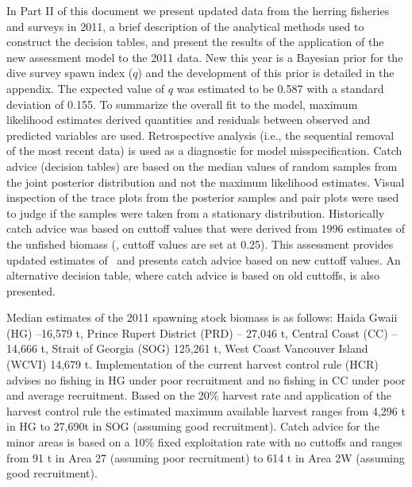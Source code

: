 In Part II of this document we present updated data from the herring fisheries and surveys in 2011, a brief description of the analytical methods used to construct the decision tables, and present the results of the application of the new assessment model to the 2011 data. New this year is a Bayesian prior for the dive survey spawn index ($q$) and the development of this prior is detailed in the appendix.  The expected value of $q$ was estimated to be 0.587 with a standard deviation of 0.155. To summarize the overall fit to the model, maximum likelihood estimates derived quantities and residuals between observed and predicted variables are used.  Retrospective analysis (i.e., the sequential removal of the most recent data) is used as a diagnostic for model misspecification.   Catch advice (decision tables) are based on the median values of random samples from the joint posterior distribution and not the maximum likelihood estimates.  Visual inspection of the trace plots from the posterior samples and pair plots were used to judge if the samples were taken from a stationary distribution. Historically catch advice was based on cuttoff values that were derived from 1996 estimates of the unfished biomass (\bo, cuttoff values are set at 0.25\bo).  This assessment provides updated estimates of \bo\ and presents catch advice based on new cuttoff values.  An alternative decision table, where catch advice is based on old cuttoffs, is also presented.  

Median estimates of the 2011 spawning stock biomass is as follows: Haida Gwaii (HG) --16,579 t, Prince Rupert District (PRD) -- 27,046 t, Central Coast (CC) -- 14,666 t, Strait of Georgia (SOG) 125,261 t, West Coast Vancouver Island (WCVI) 14,679 t.  Implementation of the current harvest control rule (HCR) advises no fishing in HG under poor recruitment and no fishing in CC under poor and average recruitment.  Based on the 20\% harvest rate and application of the harvest control rule the estimated maximum available harvest ranges from 4,296 t in HG to 27,690t in SOG (assuming good recruitment).  Catch advice for the minor areas is based on a 10\% fixed exploitation rate with no cuttoffs and ranges from 91 t in Area 27 (assuming poor recruitment) to 614 t in Area 2W (assuming good recruitment).


